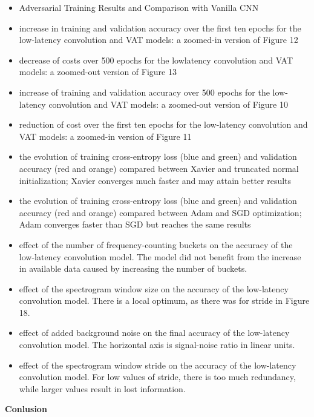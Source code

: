 \documentclass{article}
\theoremstyle{definition}
\theoremstyle{remark}
\begin{document}
\begin{itemize}
	\item Adversarial Training Results and Comparison with
Vanilla CNN
	\item increase in training and validation accuracy over the first ten epochs for the low-latency convolution and VAT models: a zoomed-in version of Figure 12
	\item decrease of costs over 500 epochs for the lowlatency convolution and VAT models: a zoomed-out version of Figure 13
	\item  increase of training and validation accuracy over 500 epochs for the low-latency convolution and VAT models: a zoomed-out version of Figure 10
	\item  reduction of cost over the first ten epochs for the low-latency convolution and VAT models: a zoomed-in version of Figure 11
	\item the evolution of training cross-entropy loss (blue and green) and validation accuracy (red and orange) compared between Xavier and truncated normal initialization; Xavier converges much faster and may attain better results
	\item the evolution of training cross-entropy loss (blue and green) and validation accuracy (red and orange) compared between Adam and SGD optimization; Adam converges faster than SGD but reaches the same results
	\item  effect of the number of frequency-counting buckets on the accuracy of the low-latency convolution model. The model did not benefit from the increase in available data caused by increasing the number of buckets.
	\item effect of the spectrogram window size on the accuracy of the low-latency convolution model. There is a local optimum, as there was for stride in Figure 18.
	\item effect of added background noise on the final accuracy of the low-latency convolution model. The horizontal axis is signal-noise ratio in linear units.
	\item effect of the spectrogram window stride on the accuracy of the low-latency convolution model. For low values of stride, there is too much redundancy, while larger values result in lost information.
\end{itemize}

\textbf{Conlusion}
\end{document}

